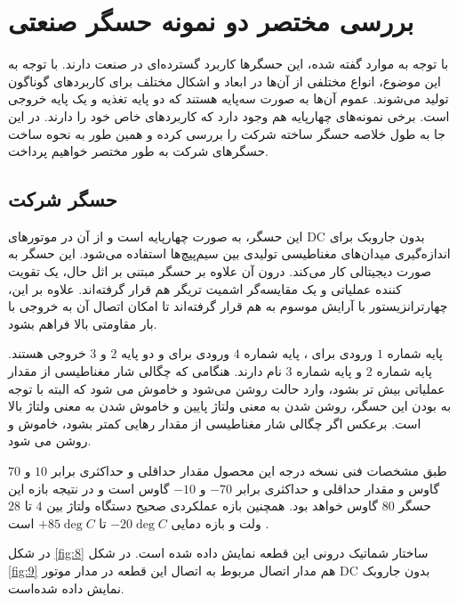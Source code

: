 \section{بررسی مختصر دو نمونه‌ حسگر  صنعتی}

با توجه به موارد گفته شده، این حسگرها کاربرد گسترده‌ای در صنعت دارند. با توجه به این موضوع، انواع مختلفی از آن‌ها در ابعاد و اشکال مختلف برای کاربردهای گوناگون تولید می‌شوند. عموم آن‌ها به صورت سه‌پایه هستند که دو پایه تغذیه و یک پایه خروجی است. برخی نمونه‌های چهارپایه هم وجود دارد که کاربردهای خاص خود را دارند. در این جا به طول خلاصه حسگر   ساخته شرکت  را بررسی کرده و همین طور به نحوه ساخت حسگرهای شرکت  به طور مختصر خواهیم پرداخت.


\subsection{حسگر  شرکت }

این حسگر، به صورت چهارپایه است و از آن در موتورهای DC بدون جاروبک برای اندازه‌گیری میدان‌های مغناطیسی تولیدی بین سیم‌پیچ‌ها استفاده می‌شود. این حسگر به صورت دیجیتالی کار می‌کند. درون آن علاوه بر حسگر مبتنی بر اثل حال، یک تقویت کننده عملیاتی و یک مقایسه‌گر اشمیت تریگر هم قرار گرفته‌اند. علاوه بر این، چهارترانزیستور  با آرایش موسوم به  هم قرار گرفته‌اند تا امکان اتصال آن به خروجی با بار مقاومتی بالا فراهم بشود. 

پایه شماره $1$ ورودی برای ، پایه شماره $4$ ورودی برای  و دو پایه $2$ و $3$ خروجی هستند. پایه شماره $2$  و پایه شماره $3$  نام دارند. هنگامی که چگالی شار مغناطیسی از مقدار عملیاتی  بیش تر بشود،  وارد حالت روشن می‌شود و  خاموش می شود که البته با توجه به  بودن این حسگر، روشن شدن به معنی ولتاژ پایین و خاموش شدن به معنی ولتاژ بالا است. برعکس اگر چگالی شار مغناطیسی از مقدار رهایی  کمتر بشود،  خاموش و  روشن می شود.

طبق مشخصات فنی نسخه درجه  این محصول مقدار حداقلی و حداکثری  برابر $10$ و $70$ گاوس و مقدار حداقلی و حداکثری  برابر $-70$ و $-10$ گاوس است و در نتیجه بازه  این حسگر $80$ گاوس خواهد بود. همچنین بازه عملکردی صحیح دستگاه ولتاژ بین $4$ تا $28$ ولت و بازه دمایی $-20\deg C$ تا $+85\deg C$ است \cite{ah266}.


در شکل \ref{fig:8} ساختار شماتیک درونی این قطعه نمایش داده شده است. در شکل \ref{fig:9} هم مدار اتصال مربوط به اتصال این قطعه در مدار موتور DC بدون جاروبک نمایش‌ داده شده‌است. 

